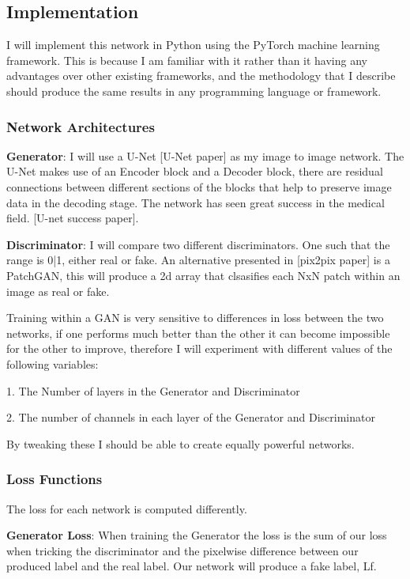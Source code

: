 \documentclass[11pt]{article}
\begin{document}
\subsection{Implementation}

I will implement this network in Python using the PyTorch machine learning framework. This is because I am familiar with it rather than it having any advantages over other existing frameworks, and the methodology that I describe should produce the same results in any programming language or framework.

\subsubsection{Network Architectures}

\textbf{Generator}: I will use a U-Net [U-Net paper] as my image to image network. The U-Net makes use of an Encoder block and a Decoder block, there are residual connections between different sections of the blocks that help to preserve image data in the decoding stage. The network has seen great success in the medical field. [U-net success paper].

\textbf{Discriminator}: I will compare two different discriminators. One such that the range is {0|1}, either real or fake. An alternative presented in [pix2pix paper] is a PatchGAN, this will produce a 2d array that clsasifies each NxN patch within an image as real or fake.

Training within a GAN is very sensitive to differences in loss between the two networks, if one performs much better than the other it can become impossible for the other to improve, therefore I will experiment with different values of the following variables:

1. The Number of layers in the Generator and Discriminator

2. The number of channels in each layer of the Generator and Discriminator

By tweaking these I should be able to create equally powerful networks. 

\subsubsection{Loss Functions}

The loss for each network is computed differently.

\textbf{Generator Loss}: When training the Generator the loss is the sum of our loss when tricking the discriminator and the pixelwise difference between our produced label and the real label. Our network will produce a fake label, Lf. 
\end{document}
